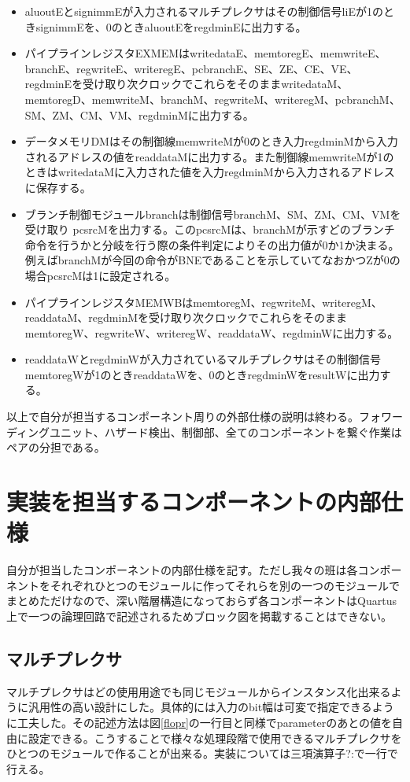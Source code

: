 \documentclass[a4paper,11pt,oneside,openany]{jsarticle}
\begin{document}
\begin{itemize}
\item aluoutEとsignimmEが入力されるマルチプレクサはその制御信号liEが1のときsignimmEを、0のときaluoutEをregdminEに出力する。
\item パイプラインレジスタEXMEMはwritedataE、memtoregE、memwriteE、branchE、regwriteE、writeregE、pcbranchE、SE、ZE、CE、VE、regdminEを受け取り次クロックでこれらをそのままwritedataM、memtoregD、memwriteM、branchM、regwriteM、writeregM、pcbranchM、SM、ZM、CM、VM、regdminMに出力する。
\item データメモリDMはその制御線memwriteMが0のとき入力regdminMから入力されるアドレスの値をreaddataMに出力する。また制御線memwriteMが1のときはwritedataMに入力された値を入力regdminMから入力されるアドレスに保存する。
\item ブランチ制御モジュールbranchは制御信号branchM、SM、ZM、CM、VMを受け取り
pcsrcMを出力する。このpcsrcMは、branchMが示すどのブランチ命令を行うかと分岐を行う際の条件判定によりその出力値が0か1か決まる。例えばbranchMが今回の命令がBNEであることを示していてなおかつZが0の場合pcsrcMは1に設定される。
\item パイプラインレジスタMEMWBはmemtoregM、regwriteM、writeregM、readdataM、regdminMを受け取り次クロックでこれらをそのままmemtoregW、regwriteW、writeregW、readdataW、regdminWに出力する。
\item readdataWとregdminWが入力されているマルチプレクサはその制御信号memtoregWが1のときreaddataWを、0のときregdminWをresultWに出力する。
\end{itemize}

以上で自分が担当するコンポーネント周りの外部仕様の説明は終わる。フォワーディングユニット、ハザード検出、制御部、全てのコンポーネントを繋ぐ作業はペアの分担である。

\section{実装を担当するコンポーネントの内部仕様}
自分が担当したコンポーネントの内部仕様を記す。ただし我々の班は各コンポーネントをそれぞれひとつのモジュールに作ってそれらを別の一つのモジュールでまとめただけなので、深い階層構造になっておらず各コンポーネントはQuartus上で一つの論理回路で記述されるためブロック図を掲載することはできない。
\subsection{マルチプレクサ}
マルチプレクサはどの使用用途でも同じモジュールからインスタンス化出来るように汎用性の高い設計にした。具体的には入力のbit幅は可変で指定できるように工夫した。その記述方法は図\ref{flopr}の一行目と同様でparameterのあとの値を自由に設定できる。こうすることで様々な処理段階で使用できるマルチプレクサをひとつのモジュールで作ることが出来る。実装については三項演算子?:で一行で行える。
\end{document}

